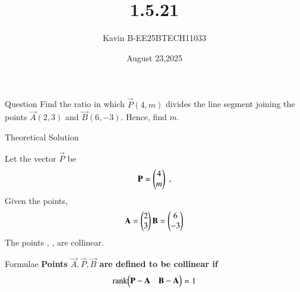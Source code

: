 \documentclass{beamer}
\begin{document}
\title 
{1.5.21}
\date{August 23,2025}


\author 
{Kavin B-EE25BTECH11033}






\frame{\titlepage}
\begin{frame}{Question}
Find the ratio in which $\vec{P}(4,m)$ divides the line segment joining the points $\vec{A}(2,3)$ and $\vec{B}(6,-3)$. Hence, find $m$.
\end{frame}



\begin{frame}{Theoretical Solution}

Let the vector $\vec{P}$ be 
\begin{align}
    \vec{P}=\begin{myvec}{4\\m}\end{myvec} \;, 
\end{align}
Given the points,
\begin{align}
    \vec{A}=\begin{myvec}{2\\3}\end{myvec}
    \vec{B}=\begin{myvec}{6\\-3}\end{myvec}
\end{align}
The points , ,  are collinear.\\

\end{frame}

\begin{frame}{Formulae}
\textbf{Points $\vec{A}, \vec{P}, \vec{B}$ are defined to be collinear if}
\begin{align}
		\label{eq:line-rank-2}
		\rank{\myvec{\vec{P}-\vec{A}& \vec{B}-\vec{A}}} = 1
\end{align}
\end{frame}
\end{document}
